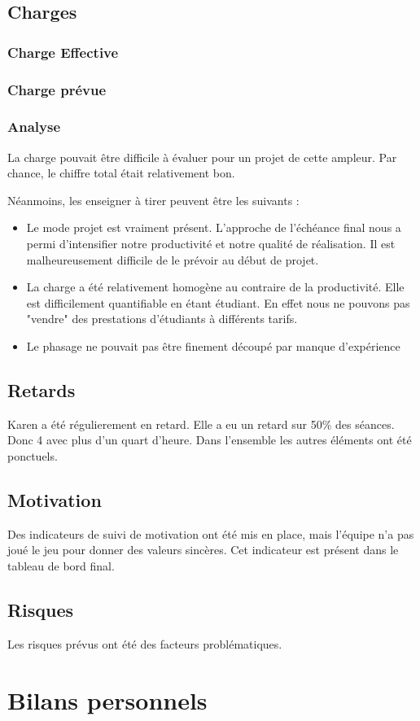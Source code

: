 \subsection{Charges}
\subsubsection{Charge Effective}


\subsubsection{Charge prévue}


\subsubsection{Analyse}
La charge pouvait être difficile à évaluer pour un projet de cette ampleur.
Par chance, le chiffre total était relativement bon. 

Néanmoins, les enseigner à tirer peuvent être les suivants : 
\begin{itemize}
\item Le mode projet est vraiment présent. L'approche de l'échéance final nous
a permi d'intensifier notre productivité et notre qualité de réalisation. Il est
malheureusement difficile de le prévoir au début de projet.
\item La charge a été relativement homogène au contraire de la productivité. Elle
est difficilement quantifiable en étant étudiant. En effet nous ne pouvons pas
"vendre" des prestations d'étudiants à différents tarifs.
\item Le phasage ne pouvait pas être finement découpé par manque d'expérience
\end{itemize}

\subsection{Retards}
Karen a été régulierement en retard. Elle a eu un retard sur 50\% des séances. 
Donc 4 avec plus d'un quart d'heure. Dans l'ensemble les autres éléments ont été
 ponctuels.

\subsection{Motivation}
Des indicateurs de suivi de motivation ont été mis en place, mais l'équipe n'a 
pas joué le jeu pour donner des valeurs sincères. 
Cet indicateur est présent dans le tableau de bord final.

\subsection{Risques}
Les risques prévus ont été des facteurs problématiques. 

\section{Bilans personnels}
